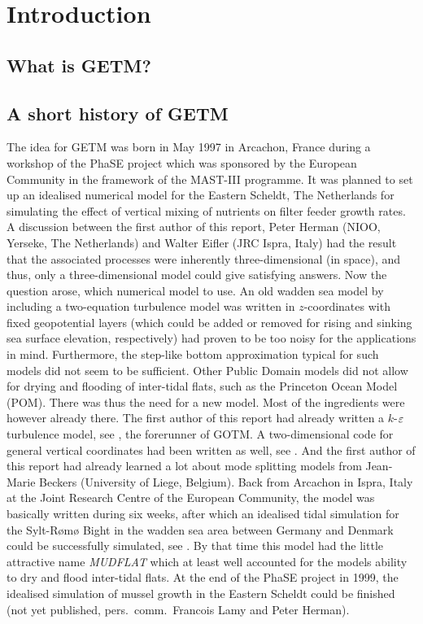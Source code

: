 
\section{Introduction}

\subsection{What is GETM?}


\subsection{A short history of GETM}\label{SectionHistory}

The idea for GETM was born in May 1997 in Arcachon, France during a 
workshop of the PhaSE project which was sponsored by the European Community
in the framework of the MAST-III programme. It was planned  
to set up an idealised numerical model for the Eastern Scheldt, The Netherlands
for simulating the effect of vertical mixing of nutrients on filter feeder
growth rates. A discussion between the first author of this report,
Peter Herman (NIOO, Yerseke, The Netherlands) and Walter Eifler
(JRC Ispra, Italy) had the result that the
associated processes were inherently three-dimensional (in space), and thus,
only a three-dimensional model could give satisfying answers. 
Now the question arose, which numerical model to use. An old
wadden sea model by \cite{BURCHARD95} including a two-equation turbulence
model was written in $z$-coordinates with fixed geopotential layers
(which could be added or removed for rising and sinking sea surface elevation,
respectively) had proven to be too noisy for the applications in mind.
Furthermore, the step-like bottom approximation typical for such models
did not seem to be sufficient. Other Public Domain models did not allow for
drying and flooding of inter-tidal flats, such as the Princeton Ocean Model
(POM). There was thus the need for a new model. Most of the ingredients were
however already there. The first author of this report had already written a
$k$-$\varepsilon$ turbulence model, see \cite{BURCHARDea95}, the forerunner
of GOTM. A two-dimensional code for general vertical coordinates had been
written as well, see \cite{BURCHARDea97}. And the first author of this report
had already learned a lot about mode splitting models from
Jean-Marie Beckers (University of Liege, Belgium).   
Back from Arcachon in Ispra, Italy at the Joint Research Centre
of the European Community, the model was basically written during six weeks,
after which an idealised tidal simulation for the Sylt-R\o m\o{} Bight
in the wadden sea area between Germany and Denmark could be successfully
simulated, see \cite{BURCHARD98}.
By that time this model had the little attractive name {\it MUDFLAT}
which at least well accounted for
the models ability to dry and flood inter-tidal flats.  
At the end of the PhaSE project in 1999, the 
idealised simulation of mussel growth in the Eastern Scheldt could be
finished (not yet published, pers.\ comm.\ Francois Lamy and Peter Herman).  

